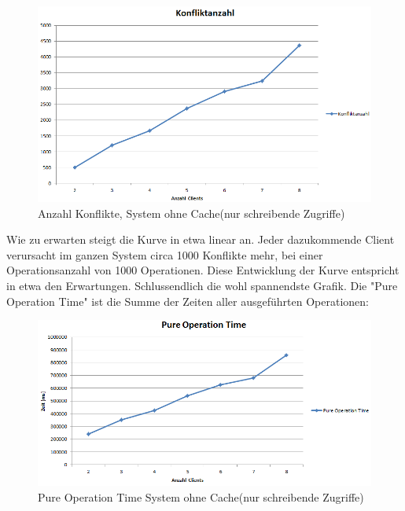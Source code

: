 \begin{figure}[H]
\begin{center}
\includegraphics[scale=0.6]{images_MessErgebnisse/incrementRMIKonfliktzahl.png}
\end{center}
\caption{Anzahl Konflikte, System ohne Cache(nur schreibende Zugriffe)}
\end{figure}

Wie zu erwarten steigt die Kurve in etwa linear an. Jeder dazukommende Client verursacht im ganzen System circa 1000 Konflikte mehr, bei einer Operationsanzahl von 1000 Operationen. Diese Entwicklung der Kurve entspricht in etwa den Erwartungen. \newline
Schlussendlich die wohl spannendste Grafik. Die "Pure Operation Time" ist die Summe der Zeiten aller ausgeführten Operationen:

\begin{figure}[H]
\begin{center}
\includegraphics[scale=0.6]{images_MessErgebnisse/incrementRMIPureOperationTime.png}
\end{center}
\caption{Pure Operation Time System ohne Cache(nur schreibende Zugriffe)}
\end{figure}

